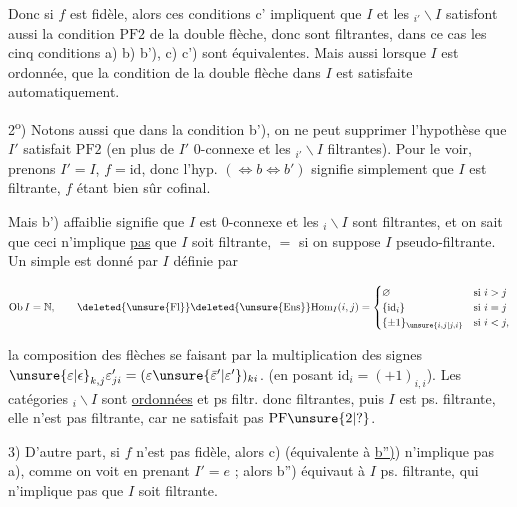 Donc si $f$ est fidèle, alors ces conditions  c' impliquent que $I$ et les $ {}_{i'}\backslash I$ satisfont aussi la condition $\mathrm{PF}2$ de la double flèche, donc sont filtrantes,  dans ce cas les cinq conditions a) b) b'), c) c') sont équivalentes. Mais aussi lorsque $I$ est ordonnée,   que la condition de la double flèche dans $I$ est satisfaite automatiquement.


2\textsuperscript{o}) Notons aussi que dans la condition b'), on ne peut supprimer l'hypothèse que $I'$ satisfait $\mathrm{PF}2$ (en plus de $I'$ $0$-connexe et les $ {}_{i'}\backslash I$ filtrantes). Pour le voir, prenons  $I'=I$, $f=\mathrm{id}$, donc l'hyp.  $(\Leftrightarrow b\Leftrightarrow b')$ signifie simplement que $I$ est filtrante, $f$ étant bien sûr cofinal.

Mais b') affaiblie signifie que $I$ est $0$-connexe et les $ {}_{i}\backslash I$ sont filtrantes, et on sait que ceci n'implique \uline{pas} que $I$ soit filtrante, $=$ si on suppose $I$ pseudo-filtrante. Un  simple est donné par $I$ définie par

\[
\mathrm{Ob}\,I=\mathbb{N},\qquad
\deleted{\unsure{\mathrm{Fl}}}\deleted{\unsure{\mathrm{Ens}}}
\mathrm{Hom}_{I}(i,j)=
\begin{cases}
\varnothing&\text{si }i>j\\
\{\mathrm{id}_i\}&\text{si }i=j\\
\{\pm1\}_{\unsure{i,j|j,i}}&\text{si }i<j,
\end{cases}
\]

la composition des flèches se faisant par la multiplication des signes $\unsure{\varepsilon|\epsilon}_{k,j}\varepsilon'_{ji}=(\varepsilon\unsure{\bar{\varepsilon}'|\varepsilon'})_{ki}$. (en posant $\mathrm{id}_i=(+1)_{i,i}$). Les catégories $ {}_i\backslash I$ sont  \uline{ordonnées} et ps filtr. donc filtrantes,  puis $I$ est ps. filtrante,  elle n'est pas filtrante, car ne satisfait pas $\mathrm{PF}\unsure{2|?}$.

3) D'autre part, si $f$ n'est pas fidèle, alors c) (équivalente à \uline{b'')}) n'implique pas a), comme on voit en prenant $I'=e$ ; alors b'') équivaut à $I$ ps. filtrante, qui n'implique pas que $I$ soit filtrante.


